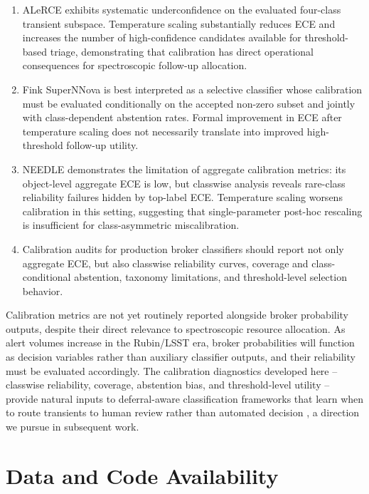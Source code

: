 \documentclass[twocolumn]{aastex631}
\begin{document}
\begin{enumerate}

\item ALeRCE exhibits systematic underconfidence on the evaluated
four-class transient subspace. Temperature scaling substantially
reduces ECE and increases the number of high-confidence candidates
available for threshold-based triage, demonstrating that
calibration has direct operational consequences for spectroscopic
follow-up allocation.

\item Fink SuperNNova is best interpreted as a selective
classifier whose calibration must be evaluated conditionally on
the accepted non-zero subset and jointly with class-dependent
abstention rates. Formal improvement in ECE after temperature
scaling does not necessarily translate into improved
high-threshold follow-up utility.

\item NEEDLE demonstrates the limitation of aggregate calibration
metrics: its object-level aggregate ECE is low, but classwise
analysis reveals rare-class reliability failures hidden by
top-label ECE. Temperature scaling worsens calibration in this
setting, suggesting that single-parameter post-hoc rescaling is
insufficient for class-asymmetric miscalibration.

\item Calibration audits for production broker classifiers should
report not only aggregate ECE, but also classwise reliability
curves, coverage and class-conditional abstention, taxonomy
limitations, and threshold-level selection behavior.

\end{enumerate}

Calibration metrics are not yet routinely reported alongside
broker probability outputs, despite their direct relevance to
spectroscopic resource allocation. As alert volumes increase in
the Rubin/LSST era, broker probabilities will function as
decision variables rather than auxiliary classifier outputs, and
their reliability must be evaluated accordingly. The calibration
diagnostics developed here -- classwise reliability, coverage,
abstention bias, and threshold-level utility -- provide natural
inputs to deferral-aware classification frameworks that learn
when to route transients to human review rather than automated
decision \citep{madras2018, mozannar2020}, a direction we pursue
in subsequent work.

\section*{Data and Code Availability}
\end{document}
